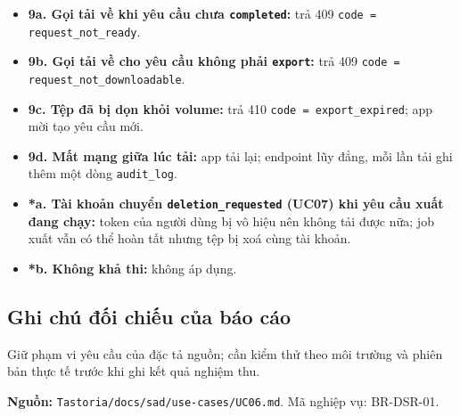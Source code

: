 \begin{itemize}
\item \textbf{9a. Gọi tải về khi yêu cầu chưa {\small\texttt{completed}}:} trả 409 {\small\texttt{code = request\_\allowbreak{}\allowbreak{}not\_\allowbreak{}\allowbreak{}ready}}.
\item \textbf{9b. Gọi tải về cho yêu cầu không phải {\small\texttt{export}}:} trả 409 {\small\texttt{code = request\_\allowbreak{}\allowbreak{}not\_\allowbreak{}\allowbreak{}downloadable}}.
\item \textbf{9c. Tệp đã bị dọn khỏi volume:} trả 410 {\small\texttt{code = export\_\allowbreak{}\allowbreak{}expired}}; app mời tạo yêu cầu mới.
\item \textbf{9d. Mất mạng giữa lúc tải:} app tải lại; endpoint lũy đẳng, mỗi lần tải ghi thêm một dòng {\small\texttt{audit\_\allowbreak{}\allowbreak{}log}}.
\item \textbf{*a. Tài khoản chuyển {\small\texttt{deletion\_\allowbreak{}\allowbreak{}requested}} (UC07) khi yêu cầu xuất đang chạy:} token của người dùng bị vô hiệu nên không tải được nữa; job xuất vẫn có thể hoàn tất nhưng tệp bị xoá cùng tài khoản.
\item \textbf{*b. Không khả thi:} không áp dụng.
\end{itemize}
\subsection{Ghi chú đối chiếu của báo cáo}
Giữ phạm vi yêu cầu của đặc tả nguồn; cần kiểm thử theo môi trường và phiên bản thực tế trước khi ghi kết quả nghiệm thu.

\textbf{Nguồn:} {\small\texttt{Tastoria/\allowbreak{}\allowbreak{}docs/\allowbreak{}\allowbreak{}sad/\allowbreak{}\allowbreak{}use-\allowbreak{}cases/\allowbreak{}\allowbreak{}UC06.\allowbreak{}md}}. Mã nghiệp vụ: BR-\allowbreak{}DSR-\allowbreak{}01.

